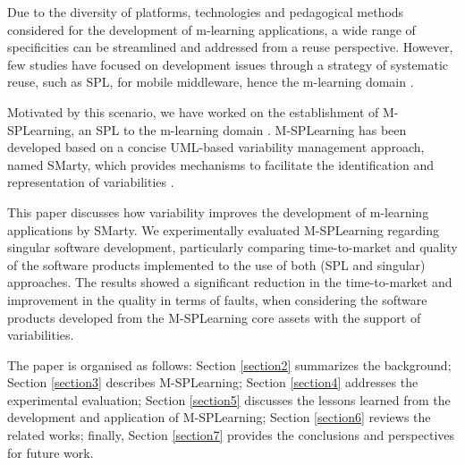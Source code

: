 Due to the diversity of platforms, technologies and pedagogical methods considered for the development of m-learning applications, a wide range of specificities can be streamlined and addressed from a reuse perspective. However, few studies have focused on development issues through a strategy of systematic reuse, such as SPL, for mobile middleware, hence the m-learning domain \cite{bezerra09}.

Motivated by this scenario, we have worked on the establishment of M-SPLearning, an SPL to the m-learning domain \cite{falvojr14a,falvojr14b}. M-SPLearning has been developed based on a concise UML-based variability management approach, named SMarty, which provides mechanisms to facilitate the identification and representation of variabilities \cite{oliveirajr10}.

This paper discusses how variability improves the development of m-learning applications by SMarty. We experimentally evaluated M-SPLearning regarding singular software development, particularly comparing time-to-market and quality of the software products implemented to the use of both (SPL and singular) approaches. The results showed a significant reduction in the time-to-market and improvement in the quality in terms of faults, when considering the software products developed from the M-SPLearning core assets with the support of variabilities.

The paper is organised as follows: Section \ref{section2} summarizes the background; Section \ref{section3} describes M-SPLearning; Section \ref{section4} addresses the experimental evaluation; Section \ref{section5} discusses the lessons learned from the development and application of M-SPLearning; Section \ref{section6} reviews the related works; finally, Section \ref{section7} provides the conclusions and perspectives for future work.
